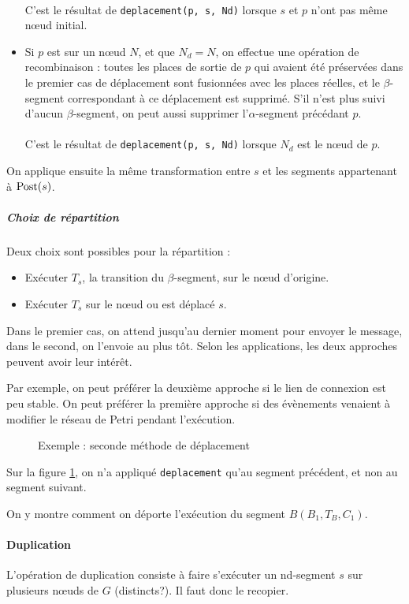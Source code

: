 \begin{itemize}
{~ \\
C'est le résultat de \texttt{deplacement(p, s, Nd)} lorsque $s$ et $p$ n'ont pas même nœud initial.
}
\\
\item Si $p$ est sur un nœud $N$, et que $N_d = N$, on effectue une opération de recombinaison : toutes les places de sortie de $p$ qui avaient été préservées dans le premier cas de déplacement sont fusionnées avec les places réelles, et le $\beta$-segment correspondant à ce déplacement est supprimé. S'il n'est plus suivi d'aucun $\beta$-segment, on peut aussi supprimer l'$\alpha$-segment précédant $p$.
~ \\
~ \\
C'est le résultat de \texttt{deplacement(p, s, Nd)} lorsque $N_d$ est le nœud de $p$.
\end{itemize}

On applique ensuite la même transformation entre $s$ et les segments appartenant à $\operatorname{Post}(s)$.

\subparagraph{Choix de répartition}
Deux choix sont possibles pour la répartition : 

\begin{itemize}
\item Exécuter $T_s$, la transition du $\beta$-segment, sur le nœud d'origine.
\item Exécuter $T_s$ sur le nœud ou est déplacé $s$.
\end{itemize}

Dans le premier cas, on attend jusqu'au dernier moment pour envoyer le message, dans le second, on l'envoie au plus tôt. Selon les applications, les deux approches peuvent avoir leur intérêt.

Par exemple, on peut préférer la deuxième approche si le lien de connexion est peu stable. On peut préférer la première approche si des évènements venaient à modifier le réseau de Petri pendant l'exécution.


\begin{figure}[h]
\centering

\caption{Exemple : seconde méthode de déplacement}
\label{fig:deplacementForm2}
\end{figure}

Sur la figure \ref{fig:deplacementForm2}, on n'a appliqué \texttt{deplacement} qu'au segment précédent, et non au segment suivant.

On y montre comment on déporte l'exécution du segment $B(B_1, T_B, C_1)$.

\paragraph{Duplication}
L'opération de duplication consiste à faire s'exécuter un nd-segment $s$ sur plusieurs nœuds de $G$ (distincts?). Il faut donc le recopier.

